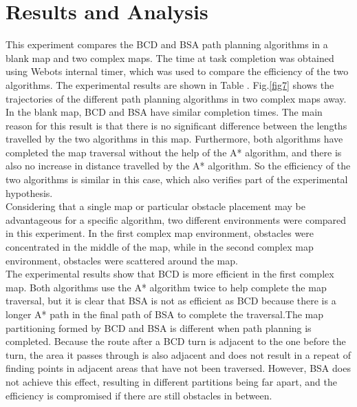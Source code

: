 \documentclass[conference]{IEEEtran}
\begin{document}
\section{Results and Analysis}
This experiment compares the BCD and BSA path planning algorithms in a blank map and two complex maps. The time at task completion was obtained using Webots internal timer, which was used to compare the efficiency of the two algorithms. The experimental results are shown in Table \uppercase\expandafter{}. Fig.\ref{fig7} shows the trajectories of the different path planning algorithms in two complex maps away.\\
In the blank map, BCD and BSA have similar completion times. The main reason for this result is that there is no significant difference between the lengths travelled by the two algorithms in this map. Furthermore, both algorithms have completed the map traversal without the help of the A* algorithm, and there is also no increase in distance travelled by the A* algorithm. So the efficiency of the two algorithms is similar in this case, which also verifies part of the experimental hypothesis.\\
Considering that a single map or particular obstacle placement may be advantageous for a specific algorithm, two different environments were compared in this experiment. In the first complex map environment, obstacles were concentrated in the middle of the map, while in the second complex map environment, obstacles were scattered around the map.\\
The experimental results show that BCD is more efficient in the first complex map. Both algorithms use the A* algorithm twice to help complete the map traversal, but it is clear that BSA is not as efficient as BCD because there is a longer A* path in the final path of BSA to complete the traversal.The map partitioning formed by BCD and BSA is different when path planning is completed. Because the route after a BCD turn is adjacent to the one before the turn, the area it passes through is also adjacent and does not result in a repeat of finding points in adjacent areas that have not been traversed. However, BSA does not achieve this effect, resulting in different partitions being far apart, and the efficiency is compromised if there are still obstacles in between.\\
\end{document}
